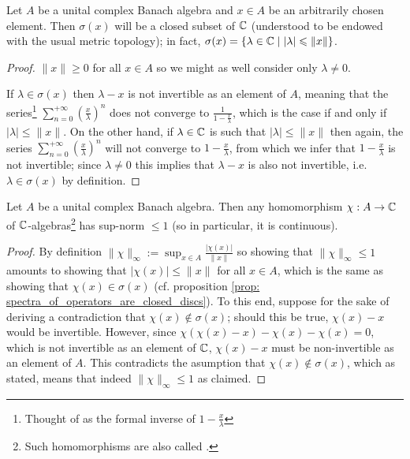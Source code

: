         \begin{proposition} \label{prop: spectra_of_operators_are_closed_discs}
            Let $A$ be a unital complex Banach algebra and $x \in A$ be an arbitrarily chosen element. Then $\sigma(x)$ will be a closed subset of $\mathbb{C}$ (understood to be endowed with the usual metric topology); in fact, $\sigma(x) = \{\lambda \in \mathbb{C} \mid |\lambda| \leqslant \|x\|\}$.
        \end{proposition}
            \begin{proof}
                $\|x\| \geq 0$ for all $x \in A$ so we might as well consider only $\lambda \not = 0$.
                
                If $\lambda \in \sigma(x)$ then $\lambda - x$ is not invertible as an element of $A$, meaning that the series\footnote{Thought of as the formal inverse of $1 - \frac{x}{\lambda}$} $\sum_{n = 0}^{+\infty} \left(\frac{x}{\lambda}\right)^n$ does not converge to $\frac{1}{1 - \frac{x}{\lambda}}$, which is the case if and only if $|\lambda| \leq \|x\|$. On the other hand, if $\lambda \in \mathbb{C}$ is such that $|\lambda| \leq \|x\|$ then again, the series $\sum_{n = 0}^{+\infty} \left(\frac{x}{\lambda}\right)^n$ will not converge to $1 - \frac{x}{\lambda}$, from which we infer that $1 - \frac{x}{\lambda}$ is not invertible; since $\lambda \not = 0$ this implies that $\lambda - x$ is also not invertible, i.e. $\lambda \in \sigma(x)$ by definition. 
            \end{proof}
        \begin{corollary} \label{coro: characters_of_unital_complex_banach_algebras_are_continuous}
            Let $A$ be a unital complex Banach algebra. Then any homomorphism $\chi: A \to \mathbb{C}$ of $\mathbb{C}$-algebras\footnote{Such homomorphisms are also called .} has sup-norm $\leq 1$ (so in particular, it is continuous).
        \end{corollary}
            \begin{proof}
                By definition $\|\chi\|_{\infty} := \sup_{x \in A} \frac{|\chi(x)|}{\|x\|}$ so showing that $\|\chi\|_{\infty} \leq 1$ amounts to showing that $|\chi(x)| \leq \|x\|$ for all $x \in A$, which is the same as showing that $\chi(x) \in \sigma(x)$ (cf. proposition \ref{prop: spectra_of_operators_are_closed_discs}). To this end, suppose for the sake of deriving a contradiction that $\chi(x) \not \in \sigma(x)$; should this be true, $\chi(x) - x$ would be invertible. However, since $\chi(\chi(x) - x) - \chi(x) - \chi(x) = 0$, which is not invertible as an element of $\mathbb{C}$, $\chi(x) - x$ must be non-invertible as an element of $A$. This contradicts the asumption that $\chi(x) \not \in \sigma(x)$, which as stated, means that indeed $\|\chi\|_{\infty} \leq 1$ as claimed.
            \end{proof}
